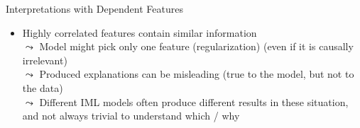 \documentclass[11pt,compress,t,notes=noshow, aspectratio=169, xcolor=table]{beamer}
\begin{document}
\begin{frame}{Interpretations with Dependent Features}
\begin{itemize}


\item Highly correlated features contain similar information \\
$\leadsto$ Model might pick only one feature (regularization) (even if it is causally irrelevant)
\\
$\leadsto$ Produced explanations can be misleading (true to the model, but not to the data) %
\\
$\leadsto$ Different IML models often produce different results in these situation, and not always trivial to understand which / why 


\pause



\end{itemize}
\end{frame}
\end{document}

